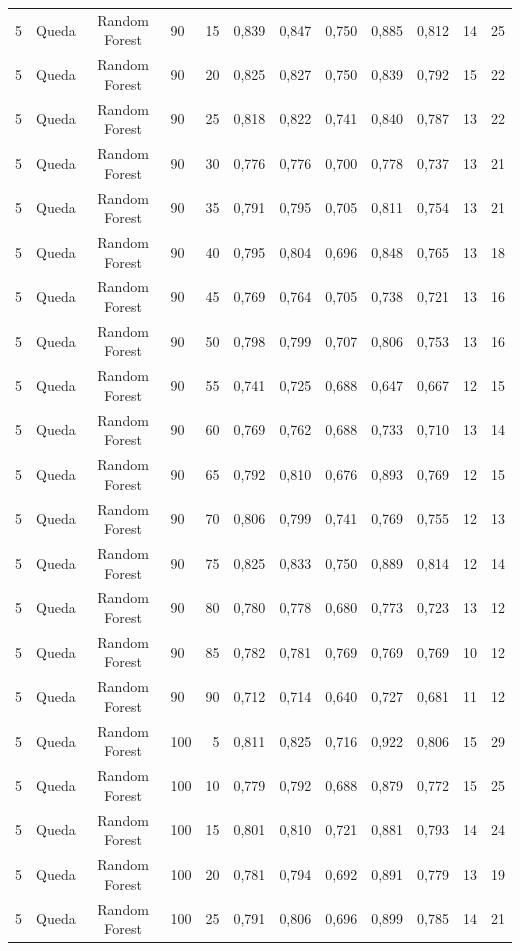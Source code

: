\begin{longtable}{ccclrrrrrrrr}
5 & Queda & Random Forest & 90 & 15 & 0,839 & 0,847 & 0,750 & 0,885 & 0,812 & 14 & 25 \\
5 & Queda & Random Forest & 90 & 20 & 0,825 & 0,827 & 0,750 & 0,839 & 0,792 & 15 & 22 \\
5 & Queda & Random Forest & 90 & 25 & 0,818 & 0,822 & 0,741 & 0,840 & 0,787 & 13 & 22 \\
5 & Queda & Random Forest & 90 & 30 & 0,776 & 0,776 & 0,700 & 0,778 & 0,737 & 13 & 21 \\
5 & Queda & Random Forest & 90 & 35 & 0,791 & 0,795 & 0,705 & 0,811 & 0,754 & 13 & 21 \\
5 & Queda & Random Forest & 90 & 40 & 0,795 & 0,804 & 0,696 & 0,848 & 0,765 & 13 & 18 \\
5 & Queda & Random Forest & 90 & 45 & 0,769 & 0,764 & 0,705 & 0,738 & 0,721 & 13 & 16 \\
5 & Queda & Random Forest & 90 & 50 & 0,798 & 0,799 & 0,707 & 0,806 & 0,753 & 13 & 16 \\
5 & Queda & Random Forest & 90 & 55 & 0,741 & 0,725 & 0,688 & 0,647 & 0,667 & 12 & 15 \\
5 & Queda & Random Forest & 90 & 60 & 0,769 & 0,762 & 0,688 & 0,733 & 0,710 & 13 & 14 \\
5 & Queda & Random Forest & 90 & 65 & 0,792 & 0,810 & 0,676 & 0,893 & 0,769 & 12 & 15 \\
5 & Queda & Random Forest & 90 & 70 & 0,806 & 0,799 & 0,741 & 0,769 & 0,755 & 12 & 13 \\
5 & Queda & Random Forest & 90 & 75 & 0,825 & 0,833 & 0,750 & 0,889 & 0,814 & 12 & 14 \\
5 & Queda & Random Forest & 90 & 80 & 0,780 & 0,778 & 0,680 & 0,773 & 0,723 & 13 & 12 \\
5 & Queda & Random Forest & 90 & 85 & 0,782 & 0,781 & 0,769 & 0,769 & 0,769 & 10 & 12 \\
5 & Queda & Random Forest & 90 & 90 & 0,712 & 0,714 & 0,640 & 0,727 & 0,681 & 11 & 12 \\
5 & Queda & Random Forest & 100 & 5 & 0,811 & 0,825 & 0,716 & 0,922 & 0,806 & 15 & 29 \\
5 & Queda & Random Forest & 100 & 10 & 0,779 & 0,792 & 0,688 & 0,879 & 0,772 & 15 & 25 \\
5 & Queda & Random Forest & 100 & 15 & 0,801 & 0,810 & 0,721 & 0,881 & 0,793 & 14 & 24 \\
5 & Queda & Random Forest & 100 & 20 & 0,781 & 0,794 & 0,692 & 0,891 & 0,779 & 13 & 19 \\
5 & Queda & Random Forest & 100 & 25 & 0,791 & 0,806 & 0,696 & 0,899 & 0,785 & 14 & 21 \\

\end{longtable}
